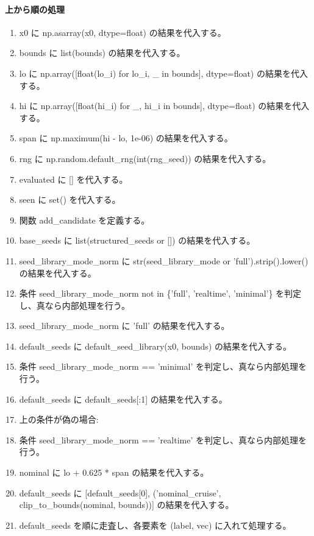 \documentclass[a4paper,11pt]{article}
\begin{document}
            \paragraph{上から順の処理}
            \begin{enumerate}[leftmargin=1.8em]
            \item x0 に np.asarray(x0, dtype=float) の結果を代入する。
\item bounds に list(bounds) の結果を代入する。
\item lo に np.array([float(lo\_i) for lo\_i, \_ in bounds], dtype=float) の結果を代入する。
\item hi に np.array([float(hi\_i) for \_, hi\_i in bounds], dtype=float) の結果を代入する。
\item span に np.maximum(hi - lo, 1e-06) の結果を代入する。
\item rng に np.random.default\_rng(int(rng\_seed)) の結果を代入する。
\item evaluated に [] を代入する。
\item seen に set() を代入する。
\item 関数 add\_candidate を定義する。
\item base\_seeds に list(structured\_seeds or []) の結果を代入する。
\item seed\_library\_mode\_norm に str(seed\_library\_mode or 'full').strip().lower() の結果を代入する。
\item 条件 seed\_library\_mode\_norm not in \{'full', 'realtime', 'minimal'\} を判定し、真なら内部処理を行う。
\item   seed\_library\_mode\_norm に 'full' の結果を代入する。
\item default\_seeds に default\_seed\_library(x0, bounds) の結果を代入する。
\item 条件 seed\_library\_mode\_norm == 'minimal' を判定し、真なら内部処理を行う。
\item   default\_seeds に default\_seeds[:1] の結果を代入する。
\item   上の条件が偽の場合:
\item   条件 seed\_library\_mode\_norm == 'realtime' を判定し、真なら内部処理を行う。
\item     nominal に lo + 0.625 * span の結果を代入する。
\item     default\_seeds に [default\_seeds[0], ('nominal\_cruise', clip\_to\_bounds(nominal, bounds))] の結果を代入する。
\item default\_seeds を順に走査し、各要素を (label, vec) に入れて処理する。

\end{enumerate}
\end{document}

